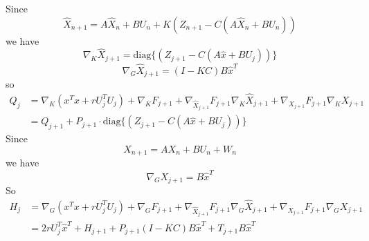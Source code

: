 \documentclass{article}
\begin{document}
\noindent Since 
\[
\widehat{X}_{n+1} = A \widehat{X}_n+BU_n+K(Z_{n+1}-C(A\widehat{X}_n+BU_n))
\]
we have 
\[
\nabla_K \widehat{X}_{j+1} = \text{diag}\{(Z_{j+1}- C(A\widehat{x}+BU_j))\}
\]
\[
\nabla_G\widehat{X}_{j+1} = (I-KC)B\widehat{x}^T
\]
so
\begin{align*}
Q_j 
&= \nabla_K (x^Tx + rU_j^TU_j) 
+ \nabla_K F_{j+1}
+ \nabla_{\widehat{X}_{j+1}} F_{j+1} \nabla_K \widehat{X}_{j+1} + \nabla_{X_{j+1}} F_{j+1} \nabla_K X_{j+1} \\
&= Q_{j+1} + P_{j+1}\cdot \text{diag}\{(Z_{j+1}- C(A\widehat{x}+BU_j))\}
\end{align*}
Since
\[
X_{n+1}=AX_n+BU_n+W_n
\]
we have 
\[
\nabla_G X_{j+1} = B\widehat{x}^T
\]
So
\begin{align*}
H_j &= \nabla_G (x^Tx + rU_j^TU_j) 
+ \nabla_G F_{j+1}
+ \nabla_{\widehat{X}_{j+1}} F_{j+1} \nabla_G\widehat{X}_{j+1} + \nabla_{X_{j+1}} F_{j+1} \nabla_G X_{j+1} \\
&= 2rU_j^T\widehat{x}^T + H_{j+1} + P_{j+1}(I-KC)B\widehat{x}^T + T_{j+1} B\widehat{x}^T
\end{align*}
\end{document}
